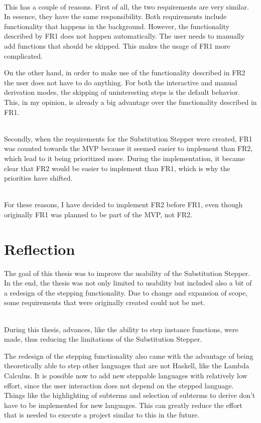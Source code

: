 \ \\
This has a couple of reasons.
First of all,
the two requirements are very similar.
In essence, they have the same responsibility.
Both requirements include functionality that happens in the background.
However, the functionality described by FR1 does not happen automatically.
The user needs to manually add functions that should be skipped.
This makes the usage of FR1 more complicated.

On the other hand, in order to make use of the functionality described in FR2 the user does not have to do anything.
For both the interactive and manual derivation modes,
the skipping of uninteresting steps is the default behavior.
This, in my opinion, is already a big advantage over the functionality described in FR1.


\ \\
Secondly,
when the requirements for the Substitution Stepper were created,
FR1 was counted towards the MVP because it seemed easier to implement than FR2,
which lead to it being prioritized more.
During the implementation,
 it became clear that FR2 would be easier to implement than FR1,
which is why the priorities have shifted.

\ \\
For these reasons, I have decided to implement FR2 before FR1,
even though originally FR1 was planned to be part of the MVP, not FR2.

\section{Reflection}
The goal of this thesis was to improve the usability of the Substitution Stepper.
In the end,
the thesis was not only limited to usability but included also a bit of a redesign of the stepping functionality.
Due to change and expansion of scope,
some requirements that were originally created could not be met.

\ \\
During this thesis,
advances, like the ability to step instance functions, were made,
thus reducing the limitations of the Substitution Stepper.

The redesign of the stepping functionality also came with the advantage of being theoretically able to step other languages that are not Haskell,
like the Lambda Calculus.
It is possible now to add new steppable languages with relatively low effort,
since the user interaction does not depend on the stepped language.
Things like the highlighting of subterms and selection of subterms to derive don't have to be implemented for new languages.
This can greatly reduce the effort that is needed to execute a project similar to this in the future.

